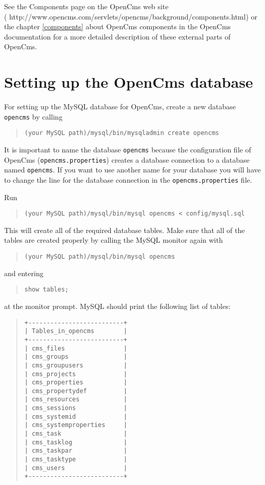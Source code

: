 See the Components page on the OpenCms web site \\
(
{http://www.opencms.com/servlets/opencms/background/components.html}) 
or the chapter \ref{components} about OpenCms components in the OpenCms documentation 
for a more detailed description of these external parts of OpenCms.


\section{\label{42dbsetup}Setting up the OpenCms database}
For setting up the MySQL database for OpenCms, create a new database \texttt{opencms}
by calling

\begin{quote}
\texttt{(your MySQL path)/mysql/bin/mysqladmin create opencms}
\end{quote}

It is important to name the database \texttt{opencms} because the configuration file of
OpenCms (\texttt{opencms.properties}) creates a database connection to a database named \texttt{opencms}.
If you want to use another name for your database
you will have to change the line for the database connection in the \texttt{opencms.properties} file.

Run
\begin{quote}
\texttt{(your MySQL path)/mysql/bin/mysql opencms < config/mysql.sql}
\end{quote}
This will create all of the required database tables. 
Make sure that all of the tables are created properly by calling the MySQL monitor again with

\begin{quote}
\texttt{(your MySQL path)/mysql/bin/mysql opencms}
\end{quote}

and entering 
\begin{quote}
\texttt{show tables;}
\end{quote}
at the monitor prompt. MySQL should print the following list of tables: 

\begin{quote}
\begin{verbatim}
+--------------------------+
| Tables_in_opencms        |
+--------------------------+
| cms_files                |
| cms_groups               |
| cms_groupusers           |
| cms_projects             |
| cms_properties           |
| cms_propertydef          |
| cms_resources            |
| cms_sessions             |
| cms_systemid             |
| cms_systemproperties     |
| cms_task                 |
| cms_tasklog              |
| cms_taskpar              |
| cms_tasktype             |
| cms_users                |
+--------------------------+
\end{verbatim}
\end{quote}

